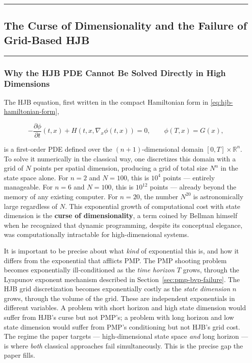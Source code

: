 \documentclass{article}
\begin{document}
\medskip\hrule\medskip




\subsection{The Curse of Dimensionality and the Failure of Grid-Based HJB}
\label{sec:curse}

\medskip\hrule\medskip

\subsubsection{Why the HJB PDE Cannot Be Solved Directly in High Dimensions}

The HJB equation, first written in the compact Hamiltonian form in \eqref{eq:hjb-hamiltonian-form},

\begin{equation}
    -\frac{\partial \phi}{\partial t}(t, x) + H(t, x, \nabla_x \phi(t, x)) = 0, \qquad \phi(T, x) = G(x),
\end{equation}

\begin{tldrbox}
is a first-order PDE defined over the $(n+1)$-dimensional domain $[0,T] \times \mathbb{R}^n$. To solve it numerically in the classical way, one discretizes this domain with a grid of $N$ points per spatial dimension, producing a grid of total size $N^n$ in the state space alone. For $n = 2$ and $N = 100$, this is $10^4$ points --- entirely manageable. For $n = 6$ and $N = 100$, this is $10^{12}$ points --- already beyond the memory of any existing computer. For $n = 20$, the number $N^{20}$ is astronomically large regardless of $N$. This exponential growth of computational cost with state dimension is the \textbf{curse of dimensionality}, a term coined by Bellman himself when he recognized that dynamic programming, despite its conceptual elegance, was computationally intractable for high-dimensional systems.

\begin{compnumissuesbox}
It is important to be precise about what \textit{kind} of exponential this is, and how it differs from the exponential that afflicts PMP. The PMP shooting problem becomes exponentially ill-conditioned as the \textit{time horizon} $T$ grows, through the Lyapunov exponent mechanism described in Section~\ref{sec:pmp-bvp-failure}. The HJB grid discretization becomes exponentially costly as the \textit{state dimension} $n$ grows, through the volume of the grid. These are independent exponentials in different variables. A problem with short horizon and high state dimension would suffer from HJB's curse but not PMP's; a problem with long horizon and low state dimension would suffer from PMP's conditioning but not HJB's grid cost. The regime the paper targets --- high-dimensional state space \textit{and} long horizon --- is where \textit{both} classical approaches fail simultaneously. This is the precise gap the paper fills.
\end{compnumissuesbox}
\end{tldrbox}
\end{document}
